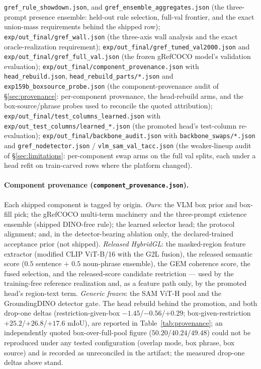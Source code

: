 \texttt{gref\_rule\_showdown.json}, and
\texttt{gref\_ensemble\_aggregates.json} (the three-prompt presence ensemble:
held-out rule selection, full-val frontier, and the exact union-mass
requirements behind the shipped row);
\texttt{exp/out\_final/gref\_wall.json} (the three-axis wall analysis and the
exact oracle-realization requirement);
\texttt{exp/out\_final/gref\_tuned\_val2000.json} and
\texttt{exp/out\_final/gref\_full\_val.json} (the frozen gRefCOCO model's
validation evaluation);
\texttt{exp/out\_final/component\_provenance.json} with
\texttt{head\_rebuild.json}, \texttt{head\_rebuild\_parts/*.json} and
\texttt{exp159b\_boxsource\_probe.json} (the component-provenance audit of
\S\ref{sec:provenance}: per-component provenance, the head-rebuild arms, and
the box-source/phrase probes used to reconcile the quoted attribution);
\texttt{exp/out\_final/test\_columns\_learned.json} with
\texttt{exp/out\_test\_columns/learned\_*.json} (the promoted head's
test-column re-evaluation);
\texttt{exp/out\_final/backbone\_audit.json} with
\texttt{backbone\_swaps/*.json} and \texttt{gref\_nodetector.json} / \texttt{vlm\_sam\_val\_tacc.json}
(the weaker-lineup audit of \S\ref{sec:limitations}: per-component swap arms
on the full val splits, each under a head refit on train-carved rows where
the platform changed).

\paragraph{Component provenance (\texttt{component\_provenance.json}).}
Each shipped component is tagged by origin. \emph{Ours}: the VLM box prior
and box-fill pick; the gRefCOCO multi-term machinery and the three-prompt
existence ensemble (shipped DINO-free rule); the learned selector head; the
protocol alignment; and, in the detector-bearing ablation only, the
declared-trained acceptance prior (not shipped). \emph{Released HybridGL}: the masked-region
feature extractor (modified CLIP ViT-B/16 with the G2L fusion), the released
semantic score ($0.5$ sentence $+$ $0.5$ noun-phrase ensemble), the GEM
coherence score, the fused selection, and the released-score candidate
restriction --- used by the training-free reference realization and, as a
feature path only, by the promoted head's region-text term. \emph{Generic
frozen}: the SAM ViT-H pool and the GroundingDINO detector gate. The head
rebuild behind the promotion, and both drop-one deltas
(restriction-given-box $-1.45$/$-0.56$/$+0.29$;
box-given-restriction $+25.2$/$+26.8$/$+17.6$ mIoU), are reported in
Table~\ref{tab:provenance}; an independently quoted box-over-full-pool figure
($50.20$/$40.24$/$49.48$) could not be reproduced under any tested
configuration (overlap mode, box phrase, box source) and is recorded as
unreconciled in the artifact; the measured drop-one deltas above stand.
